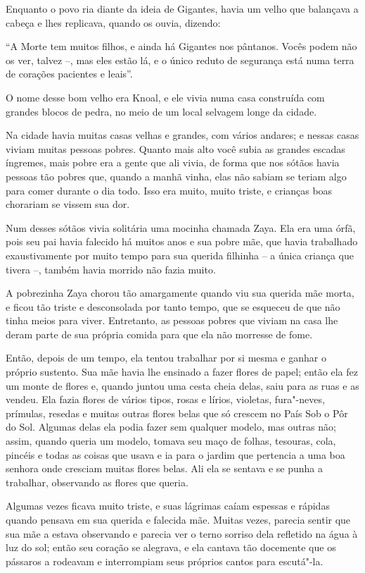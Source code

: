Enquanto o povo ria diante da ideia de Gigantes, havia um velho que
balançava a cabeça e lhes replicava, quando os ouvia, dizendo:

``A Morte tem muitos filhos, e ainda há Gigantes nos pântanos. Vocês
podem não os ver, talvez --, mas eles estão lá, e o único reduto de
segurança está numa terra de corações pacientes e leais''.

O nome desse bom velho era Knoal, e ele vivia numa casa construída com
grandes blocos de pedra, no meio de um local selvagem longe da cidade.

Na cidade havia muitas casas velhas e grandes, com vários andares; e
nessas casas viviam muitas pessoas pobres. Quanto mais alto você subia
as grandes escadas íngremes, mais pobre era a gente que ali vivia, de
forma que nos sótãos havia pessoas tão pobres que, quando a manhã vinha,
elas não sabiam se teriam algo para comer durante o dia todo. Isso era
muito, muito triste, e crianças boas chorariam se vissem sua dor.

Num desses sótãos vivia solitária uma mocinha chamada Zaya. Ela era uma
órfã, pois seu pai havia falecido há muitos anos e sua pobre mãe, que
havia trabalhado exaustivamente por muito tempo para sua querida
filhinha -- a única criança que tivera --, também havia morrido não
fazia muito.

A pobrezinha Zaya chorou tão amargamente quando viu sua querida mãe
morta, e ficou tão triste e desconsolada por tanto tempo, que se
esqueceu de que não tinha meios para viver. Entretanto, as pessoas
pobres que viviam na casa lhe deram parte de sua própria comida para que
ela não morresse de fome.

Então, depois de um tempo, ela tentou trabalhar por si mesma e ganhar o
próprio sustento. Sua mãe havia lhe ensinado a fazer flores de papel;
então ela fez um monte de flores e, quando juntou uma cesta cheia delas,
saiu para as ruas e as vendeu. Ela fazia flores de vários tipos, rosas e
lírios, violetas, fura"-neves, prímulas, resedas e muitas outras flores
belas que só crescem no País Sob o Pôr do Sol. Algumas delas ela podia
fazer sem qualquer modelo, mas outras não; assim, quando queria um
modelo, tomava seu maço de folhas, tesouras, cola, pincéis e todas as
coisas que usava e ia para o jardim que pertencia a uma boa senhora onde
cresciam muitas flores belas. Ali ela se sentava e se punha a trabalhar,
observando as flores que queria.

Algumas vezes ficava muito triste, e suas lágrimas caíam espessas e
rápidas quando pensava em sua querida e falecida mãe. Muitas vezes,
parecia sentir que sua mãe a estava observando e parecia ver o terno sorriso
dela refletido na água à luz do sol; então seu coração se alegrava, e
ela cantava tão docemente que os pássaros a rodeavam e interrompiam seus
próprios cantos para escutá"-la.

